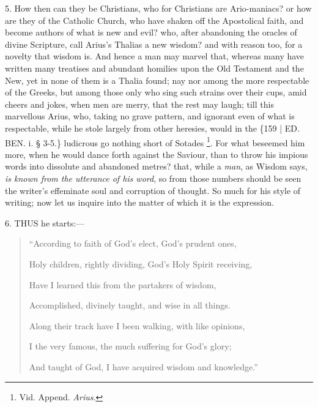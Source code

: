 5. How then can they be
Christians, who for Christians are Ario-maniacs? or how are they of
the Catholic Church, who have shaken off the Apostolical faith, and
become authors of what is new and evil? who, after abandoning the
oracles of divine Scripture, call Arius's Thalias a new wisdom? and
with reason too, for a novelty that wisdom is. And hence a man may
marvel that, whereas many have written many treatises and abundant
homilies upon the Old Testament and the New, yet in none of them is a
Thalia found; nay nor among the more respectable of the Greeks, but
among those only who sing such strains over their cups, amid cheers
and jokes, when men are merry, that the rest may laugh; till this
marvellous Arius, who, taking no grave pattern, and ignorant even of
what is respectable, while he stole largely from other heresies, would
in the \{159 | ED. BEN.
i. § 3-5.\} ludicrous go nothing short of Sotades \footnote{Vid. Append. \emph{Arius}.}. For what beseemed him more, when he would dance forth against
the Saviour, than to throw his impious words into dissolute and
abandoned metres? that, while a \emph{man}, as Wisdom says, \emph{is
known from the utterance of his word}, so from those numbers should
be seen the writer's effeminate soul and corruption of thought. So
much for his style of writing; now let us inquire into the matter of
which it is the expression.


6. THUS
he starts:—

\begin{quote}

``According to faith of God's
elect, God's prudent ones,

Holy children, rightly dividing, God's Holy Spirit receiving,

Have I learned this from the partakers of wisdom,

Accomplished, divinely taught, and wise in all things.

Along their track have I been walking, with like opinions,

I the very famous, the much suffering for God's glory;

And taught of God, I have acquired wisdom and knowledge.''

\end{quote}

